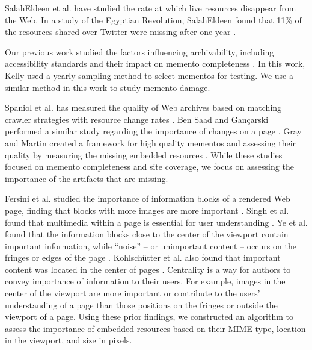 SalahEldeen et al. have studied the rate at which live resources disappear from the Web. In a study of the Egyptian Revolution, SalahEldeen found that 11\% of the resources shared over Twitter were missing after one year \cite{losingmyrevolution, hanyTPDL2013}. %

Our previous work studied the factors influencing archivability, including accessibility standards and their impact on memento completeness \cite{kellyTPDL2013}. In this work, Kelly used a yearly sampling method to select mementos for testing. We use a similar method in this work to study memento damage.

Spaniol et al. has measured the quality of Web archives based on matching crawler strategies with resource change rates \cite{spaniol9catch, spaniol2009data, Denev:2009:SFQ:1687627.1687694}. Ben Saad and Gan\c{c}arski performed a similar study regarding the importance of changes on a page \cite{saad2011}. Gray and Martin created a framework for high quality mementos and assessing their quality by measuring the missing embedded resources \cite{mementoQuality}. While these studies focused on memento completeness and site coverage, we focus on assessing the importance of the artifacts that are missing. 

Fersini et al. studied the importance of information blocks of a rendered Web page, finding that blocks with more images are more important \cite{Fersini20081431}. Singh et al. found that multimedia within a page is essential for user understanding \cite{Singh2009}. Ye et al. found that the information blocks close to the center of the viewport contain important information, while ``noise'' -- or unimportant content -- occurs on the fringes or edges of the page \cite{Yi2003}. Kohlsch\"{u}tter et al. also found that important content was located in the center of pages \cite{boilerPlate}. Centrality is a way for authors to convey importance of information to their users. For example, images in the center of the viewport are more important or contribute to the users' understanding of a page than those positions on the fringes or outside the viewport of a page. Using these prior findings, we constructed an algorithm to assess the importance of embedded resources based on their MIME type, location in the viewport, and size in pixels.

